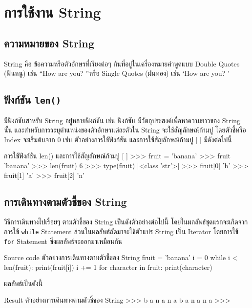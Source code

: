 \chapter{การใช้งาน String}
\section{ความหมายของ String}

String คือ ข้อความหรือตัวอักษรที่เรียงต่อๆ กันที่อยู่ในเครื่องหมายคำพูดแบบ Double Quotes (ฟันหนู) เช่น \textquotedblleft How are you? \textquotedblright  หรือ Single Quotes (ฝนทอง) เช่น \textquoteleft How are you? \textquoteright

\section{ฟังก์ชัน \texttt{len()}}

มีฟังก์ชันสำหรับ String อยู่หลายฟังก์ชัน เช่น ฟังก์ชัน  มีวัตถุประสงค์เพื่อหาความยาวของ String นั้น และสำหรับการระบุตำแหน่งของตัวอักษรแต่ละตัวใน String จะใช้สัญลักษณ์ก้ามปู \pyinline{[ ]} โดยตัวชี้หรือ Index จะเริ่มต้นจาก 0 เช่น  ตัวอย่างการใช้ฟังก์ชัน  และการใช้สัญลักษณ์ก้ามปู [ ] มีดังต่อไปนี้

\begin{codelist}{การใช้ฟังก์ชัน len() และการใช้สัญลักษณ์ก้ามปู [ ]}{}
>>> fruit = 'banana'
>>> fruit
'banana'
>>> len(fruit)
6
>>> type(fruit)
|<class \rq{}str\rq{}>|
>>> fruit[0]
'b'
>>> fruit[1]
'a'
>>> fruit[2]
'n'
\end{codelist}


\section{การเดินทางตามตัวชี้ของ String}

วิธีการเดินทางไปเรื่อยๆ ตามตัวชี้ของ String เป็นดังตัวอย่างต่อไปนี้ โดยในผลลัพธ์ชุดแรกจะเกิดจากการใช้ \texttt{while} Statement ส่วนในผลลัพธ์ถัดมาจะใช้ตัวแปร String เป็น Iterator โดยการใช้ \texttt{for} Statement ซึ่งผลลัพธ์จะออกมาเหมือนกัน


\begin{codelist}{Source code ตัวอย่างการเดินทางตามตัวชี้ของ String}{}
fruit = 'banana'
i = 0
while i < len(fruit):
    print(fruit[i])
    i += 1
for character in fruit: print(character)
\end{codelist}

ผลลัพธ์เป็นดังนี้

\begin{codelist}{Result ตัวอย่างการเดินทางตามตัวชี้ของ String}{}
>>>
b
a
n
a
n
a
b
a
n
a
n
a
>>>
\end{codelist}



